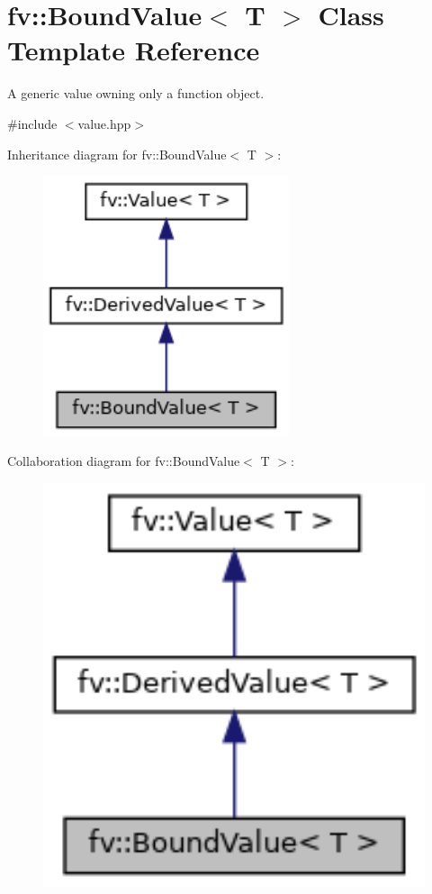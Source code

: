 \hypertarget{classfv_1_1BoundValue}{}\section{fv\+:\+:Bound\+Value$<$ T $>$ Class Template Reference}
\label{classfv_1_1BoundValue}


A generic value owning only a function object.  




{\ttfamily \#include $<$value.\+hpp$>$}



Inheritance diagram for fv\+:\+:Bound\+Value$<$ T $>$\+:
\nopagebreak
\begin{figure}[H]
\begin{center}
\leavevmode
\includegraphics[width=205pt]{classfv_1_1BoundValue__inherit__graph}
\end{center}
\end{figure}


Collaboration diagram for fv\+:\+:Bound\+Value$<$ T $>$\+:
\nopagebreak
\begin{figure}[H]
\begin{center}
\leavevmode
\includegraphics[width=347pt]{classfv_1_1BoundValue__coll__graph}
\end{center}
\end{figure}
